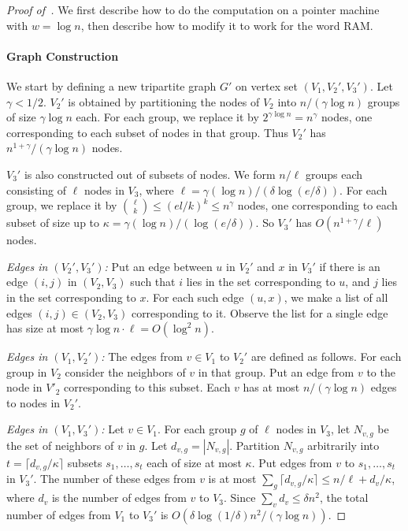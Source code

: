 \begin{proof}[Proof of~] We first describe how to do the computation on a pointer machine with $w=\log n$, then describe how to modify it to work for the word RAM.


\paragraph{Graph Construction} We start by defining a new tripartite graph $G'$ on vertex set $(V_1,V_2',V_3')$.
Let $\gamma < 1/2$. $V_2'$ is obtained by partitioning the nodes of $V_2$ into $n/(\gamma \log n)$ groups of size $\gamma \log n$ each. For each group, we replace it by $2^{\gamma \log n} = n^\gamma$ nodes, one corresponding to each subset of nodes in that group. Thus $V_2'$ has $n^{1+\gamma}/(\gamma \log n)$ nodes.

$V_3'$ is also constructed out of subsets of nodes. We form $n/\ell$ groups each consisting of $\ell$ nodes in $V_3$, where $\ell = \gamma (\log n) /(\delta \log(e/\delta))$. For each group, we replace it by $\binom{\ell}{k} \leq (el/k)^k \leq n^\gamma$ nodes, one corresponding to each subset of size up to $\kappa = \gamma (\log n)/(\log (e/\delta))$. So $V_3'$ has $O(n^{1+\gamma}/\ell)$ nodes.

\smallskip
\noindent
\emph{Edges in $(V_2',V_3')$:} Put an edge between $u$ in $V_2'$ and $x$ in $V_3'$ if there is an edge $(i,j)$ in $(V_2,V_3)$ such that $i$ lies in the set corresponding to $u$, and $j$ lies in the set corresponding to $x$. For each such edge $(u,x)$, we make a list of all edges $(i,j) \in (V_2,V_3)$ corresponding to it. Observe the list for a single edge has size at most $ \gamma \log n \cdot \ell = O(\log^2 n)$. 

\smallskip
\noindent
\emph{Edges in $(V_1,V_2')$:} The edges from $v \in V_1$ to $V_2'$ are defined as follows. For each group in $V_2$ consider the neighbors of $v$ in that group. Put an edge from $v$ to the node in $V'_2$ corresponding to this subset. Each $v$ has at most $n/(\gamma \log n)$ edges to nodes in $V_2'$.

\smallskip
\noindent
\emph{Edges in $(V_1,V_3')$:} Let $v \in V_1$. For each group $g$ of $\ell$ nodes in $V_3$, let $N_{v,g}$ be the set of neighbors of $v$ in $g$. Let $d_{v,g} = |N_{v,g}|$. Partition $N_{v,g}$ arbitrarily into $t=\lceil d_{v,g}/\kappa \rceil$ subsets $s_1,\ldots,s_t$ each of size at most $\kappa$. Put edges from $v$ to $s_1,\ldots,s_t$ in $V_3'$. The number of these edges from $v$ is at most $\sum_g \lceil d_{v,g}/\kappa \rceil \leq n/\ell + d_v /\kappa$, where $d_v$ is the number of edges from $v$ to $V_3$. Since $\sum_v d_v \leq \delta n^2$, the total number of edges from $V_1$ to $V_3'$ is $O(\delta \log (1/\delta) n^2 /(\gamma \log n))$.


\end{proof}
